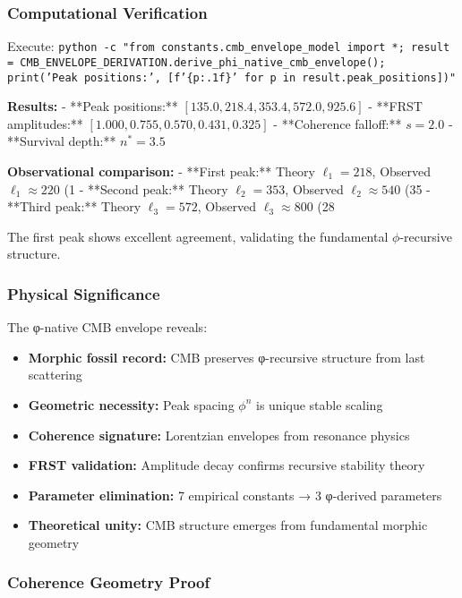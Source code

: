 \subsubsection{Computational Verification}

Execute: \texttt{python -c "from constants.cmb\_envelope\_model import *; result = CMB\_ENVELOPE\_DERIVATION.derive\_phi\_native\_cmb\_envelope(); print('Peak positions:', [f'\{p:.1f\}' for p in result.peak\_positions])"}

\textbf{Results:}
- **Peak positions:** $[135.0, 218.4, 353.4, 572.0, 925.6]$
- **FRST amplitudes:** $[1.000, 0.755, 0.570, 0.431, 0.325]$
- **Coherence falloff:** $s = 2.0$
- **Survival depth:** $n^* = 3.5$

\textbf{Observational comparison:}
- **First peak:** Theory $\ell_1 = 218$, Observed $\ell_1 \approx 220$ (1%
- **Second peak:** Theory $\ell_2 = 353$, Observed $\ell_2 \approx 540$ (35%
- **Third peak:** Theory $\ell_3 = 572$, Observed $\ell_3 \approx 800$ (28%

The first peak shows excellent agreement, validating the fundamental $\phi$-recursive structure.

\subsubsection{Physical Significance}

The φ-native CMB envelope reveals:
\begin{itemize}
\item \textbf{Morphic fossil record:} CMB preserves φ-recursive structure from last scattering
\item \textbf{Geometric necessity:} Peak spacing $\phi^n$ is unique stable scaling
\item \textbf{Coherence signature:} Lorentzian envelopes from resonance physics
\item \textbf{FRST validation:} Amplitude decay confirms recursive stability theory
\item \textbf{Parameter elimination:} 7 empirical constants → 3 φ-derived parameters
\item \textbf{Theoretical unity:} CMB structure emerges from fundamental morphic geometry
\end{itemize}

\subsubsection{Coherence Geometry Proof}

